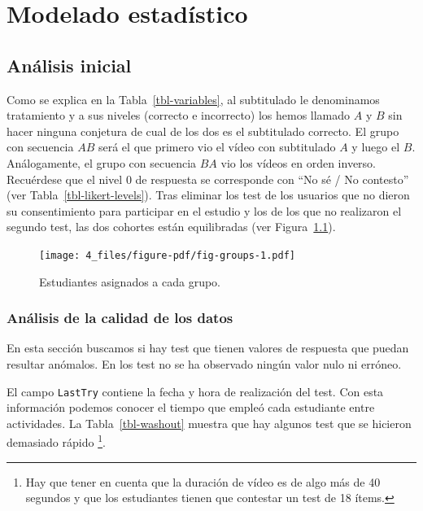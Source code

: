 \documentclass[
  12pt,
  a4paper,
  extrafontsizes,
  onecolumn,
  openright]{memoir}
\begin{document}
\hypertarget{sec-modelado}{%
\chapter{Modelado estadístico}\label{sec-modelado}}

\hypertarget{sec-eda}{%
\section{Análisis inicial}\label{sec-eda}}

Como se explica en la Tabla~\ref{tbl-variables}, al subtitulado le
denominamos tratamiento y a sus niveles (correcto e incorrecto) los
hemos llamado \(A\) y \(B\) sin hacer ninguna conjetura de cual de los
dos es el subtitulado correcto. El grupo con secuencia \(AB\) será el
que primero vio el vídeo con subtitulado \(A\) y luego el \(B\).
Análogamente, el grupo con secuencia \(BA\) vio los vídeos en orden
inverso. Recuérdese que el nivel 0 de respuesta se corresponde con
\enquote{No sé / No contesto} (ver Tabla~\ref{tbl-likert-levels}). Tras
eliminar los test de los usuarios que no dieron su consentimiento para
participar en el estudio y los de los que no realizaron el segundo test,
las dos cohortes están equilibradas (ver Figura~\ref{fig-groups}).

\begin{figure}[h]

{\centering \texttt{[image: 4\_files/figure-pdf/fig-groups-1.pdf]}

}

\caption{\label{fig-groups}Estudiantes asignados a cada grupo.}

\end{figure}

\hypertarget{anuxe1lisis-de-la-calidad-de-los-datos}{%
\subsection{Análisis de la calidad de los
datos}\label{anuxe1lisis-de-la-calidad-de-los-datos}}

En esta sección buscamos si hay test que tienen valores de respuesta que
puedan resultar anómalos. En los test no se ha observado ningún valor
nulo ni erróneo.

El campo \texttt{LastTry} contiene la fecha y hora de realización del
test. Con esta información podemos conocer el tiempo que empleó cada
estudiante entre actividades. La Tabla~\ref{tbl-washout} muestra que hay
algunos test que se hicieron demasiado rápido \footnote{Hay que tener en
  cuenta que la duración de vídeo es de algo más de 40 segundos y que
  los estudiantes tienen que contestar un test de 18 ítems.}.
\end{document}
